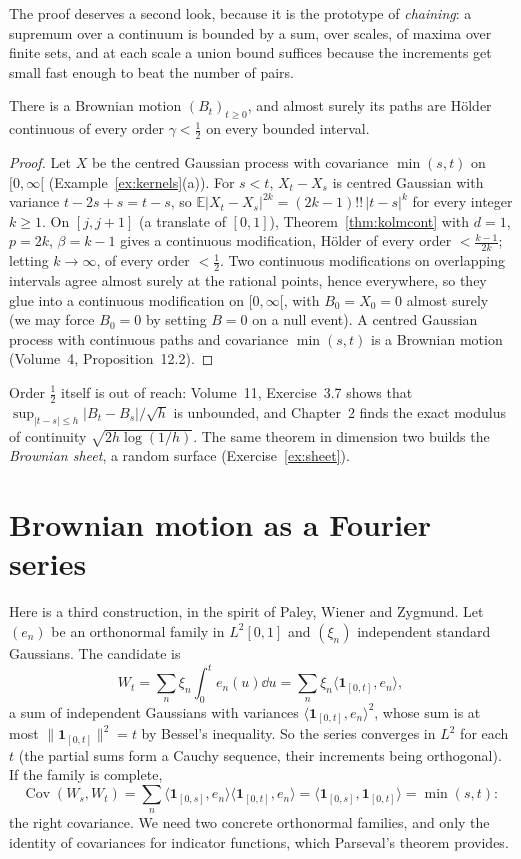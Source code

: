 The proof deserves a second look, because it is the prototype of \emph{chaining}: a supremum over a continuum is bounded by a sum, over scales, of maxima over finite sets, and at each scale a union bound
suffices because the increments get small fast enough to beat the number of pairs.

\begin{corollary}\label{cor:bmholder}
There is a Brownian motion $(B_t)_{t\ge0}$, and almost surely its paths are H\"older continuous of every order $\gamma<\frac12$ on every bounded interval.
\end{corollary}

\begin{proof}
Let $X$ be the centred Gaussian process with covariance $\min(s,t)$ on $[0,\infty[$ (Example~\ref{ex:kernels}(a)). For $s<t$, $X_t-X_s$ is centred Gaussian with variance $t-2s+s=t-s$, so
$\mathbb E|X_t-X_s|^{2k}=(2k-1)!!\,|t-s|^k$ for every integer $k\ge1$. On $[j,j+1]$ (a translate of $[0,1]$), Theorem~\ref{thm:kolmcont} with $d=1$, $p=2k$, $\beta=k-1$ gives a continuous modification, H\"older of
every order $<\frac{k-1}{2k}$; letting $k\to\infty$, of every order $<\frac12$. Two continuous modifications on overlapping intervals agree almost surely at the rational points, hence everywhere, so they glue into a
continuous modification on $[0,\infty[$, with $B_0=X_0=0$ almost surely (we may force $B_0=0$ by setting $B=0$ on a null event). A centred Gaussian process with continuous paths and covariance $\min(s,t)$ is a
Brownian motion (Volume~4, Proposition~12.2).
\end{proof}

Order $\frac12$ itself is out of reach: Volume~11, Exercise~3.7 shows that $\sup_{|t-s|\le h}|B_t-B_s|/\sqrt h$ is unbounded, and Chapter~2 finds the exact modulus of continuity $\sqrt{2h\log(1/h)}$.
The same theorem in dimension two builds the \emph{Brownian sheet}, a random surface (Exercise~\ref{ex:sheet}).

\section{Brownian motion as a Fourier series}

Here is a third construction, in the spirit of Paley, Wiener and Zygmund. Let $(e_n)$ be an orthonormal family in $L^2[0,1]$ and $(\xi_n)$ independent standard Gaussians. The candidate is
\[
W_t=\sum_n\xi_n\int_0^te_n(u)\dd u=\sum_n\xi_n\langle\mathbf 1_{[0,t]},e_n\rangle,
\]
a sum of independent Gaussians with variances $\langle\mathbf 1_{[0,t]},e_n\rangle^2$, whose sum is at most $\|\mathbf 1_{[0,t]}\|^2=t$ by Bessel's inequality. So the series converges in $L^2$ for each $t$ (the partial sums
form a Cauchy sequence, their increments being orthogonal). If the family is complete,
\[
\operatorname{Cov}(W_s,W_t)=\sum_n\langle\mathbf 1_{[0,s]},e_n\rangle\langle\mathbf 1_{[0,t]},e_n\rangle=\langle\mathbf 1_{[0,s]},\mathbf 1_{[0,t]}\rangle=\min(s,t):
\]
the right covariance. We need two concrete orthonormal families, and only the identity of covariances for indicator functions, which Parseval's theorem provides.

